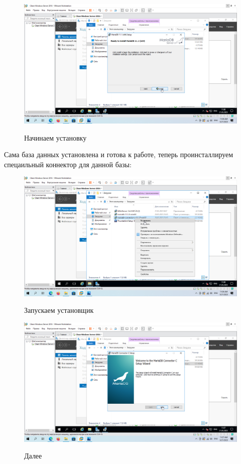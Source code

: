 \documentclass[a4paper]{article}
\begin{document}
  \begin{figure}[H]
    \centering
    \includegraphics[width=\textwidth]{11_0022}
    \label{img:22}
    \caption{Начинаем установку}
  \end{figure}

  Сама база данных установлена и готова к работе, теперь проинсталлируем
  спецаильный коннектор для данной базы:

  \begin{figure}[H]
    \centering
    \includegraphics[width=\textwidth]{11_0023}
    \label{img:23}
    \caption{Запускаем установщик}
  \end{figure}

  \begin{figure}[H]
    \centering
    \includegraphics[width=\textwidth]{11_0024}
    \label{img:24}
    \caption{Далее}
  \end{figure}
\end{document}
